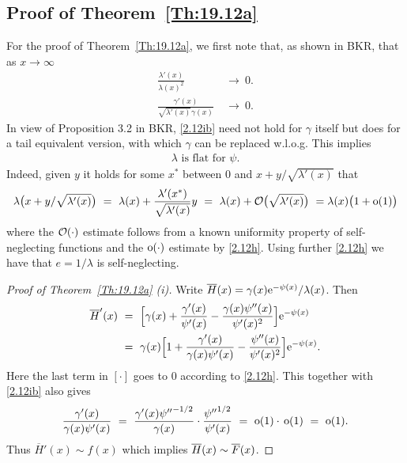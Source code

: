\begin{subappendices}
\section{Proof of Theorem~\ref{Th:19.12a}} \label{S:ProofofTheorem}

For the proof of Theorem~\ref{Th:19.12a}, we first note that,
as shown in BKR, that as $x\to \infty$
\begin{align}
\label{2.12h} \frac{\lambda'(x)}{{\lambda(x)}^2}\ &\to\ 0.\\
\label{2.12ib} \frac{\gamma'(x)}{{\sqrt{\lambda'(x)}}\gamma(x)}\ &\to\ 0.
\end{align}
In view of Proposition 3.2 in BKR, \eqref{2.12ib} need not hold for $\gamma$ itself but does for  a tail equivalent version, with which $\gamma$ can be replaced w.l.o.g. This implies
\begin{align}
\label{19.12c} \lambda\text{\ is flat for }\psi.
\end{align}
Indeed, given $y$ it holds for some $x^*$ between $0$ and $x+y/\sqrt{\lambda'(x)}$ that
\[\lambda\bigl(x+y/\sqrt{\lambda'(x)}\bigr)\ =\ \lambda(x)+\frac{\lambda'(x^*)}{\sqrt{\lambda'(x)}}y\ =\
\lambda(x)+\Oh\bigl(\sqrt{\lambda'(x)}\bigr)\ = \lambda(x)\bigl(1+\oh(1)\bigr)\]
where the ${\mathcal{O}}(\cdot)$ estimate follows from a known uniformity property of self-neglecting functions and the ${\mathrm{o}}(\cdot)$ estimate
by \eqref{2.12h}.
Using further \eqref{2.12h} we have that $e=1/\lambda$ is self-neglecting.



\begin{proof}[Proof of Theorem~{\ref{Th:19.12a}} {\rm (i)}]
Write $\overline{H}(x)=\gamma(x)\mathrm{e}^{-\psi(x)}/\lambda(x)$. %
Then
\begin{align*}\overline{H}'(x)\ &=\ \Bigl[\gamma(x)+\frac{\gamma'(x)}{\psi'(x)}-
\frac{\gamma(x)\psi''(x)}{\psi'(x)^2}\Bigr]\mathrm{e}^{-\psi(x)}\\
&=\ \gamma(x)\Bigl[1+\frac{\gamma'(x)}{\gamma(x)\psi'(x)}-
\frac{\psi''(x)}{\psi'(x)^2}\Bigr]\mathrm{e}^{-\psi(x)}.
\end{align*}
Here the last term in $[\cdot]$ goes to 0 according to \eqref{2.12h}. This
together with \eqref{2.12ib}
also gives
\[\frac{\gamma'(x)}{\gamma(x)\psi'(x)}\ =\ \frac{\gamma'(x){\psi''}^{-1/2}}{\gamma(x)}\cdot
\frac{{\psi''}^{1/2}}{\psi'(x)}\ =\ \oh(1)\cdot\,\oh(1)\ =\ \oh(1).\]
Thus $\overline{H}'(x)\sim f(x)$ which implies $\overline{H}(x)\sim \overline F(x)$.
\end{proof}


\end{subappendices}
